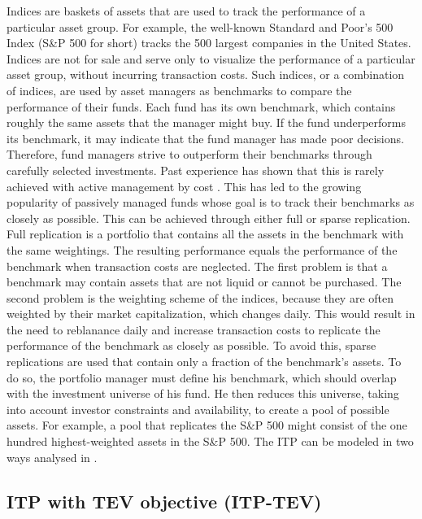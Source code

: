 \documentclass[
  oneside]{book}
\begin{document}
Indices are baskets of assets that are used to track the performance of a particular asset group. For example, the well-known Standard and Poor's 500 Index (S\&P 500 for short) tracks the 500 largest companies in the United States. Indices are not for sale and serve only to visualize the performance of a particular asset group, without incurring transaction costs. Such indices, or a combination of indices, are used by asset managers as benchmarks to compare the performance of their funds. Each fund has its own benchmark, which contains roughly the same assets that the manager might buy. If the fund underperforms its benchmark, it may indicate that the fund manager has made poor decisions. Therefore, fund managers strive to outperform their benchmarks through carefully selected investments. Past experience has shown that this is rarely achieved with active management by cost \citep{Desm2016}. This has led to the growing popularity of passively managed funds whose goal is to track their benchmarks as closely as possible. This can be achieved through either full or sparse replication. Full replication is a portfolio that contains all the assets in the benchmark with the same weightings. The resulting performance equals the performance of the benchmark when transaction costs are neglected. The first problem is that a benchmark may contain assets that are not liquid or cannot be purchased. The second problem is the weighting scheme of the indices, because they are often weighted by their market capitalization, which changes daily. This would result in the need to reblanance daily and increase transaction costs to replicate the performance of the benchmark as closely as possible. To avoid this, sparse replications are used that contain only a fraction of the benchmark's assets. To do so, the portfolio manager must define his benchmark, which should overlap with the investment universe of his fund. He then reduces this universe, taking into account investor constraints and availability, to create a pool of possible assets. For example, a pool that replicates the S\&P 500 might consist of the one hundred highest-weighted assets in the S\&P 500. The ITP can be modeled in two ways analysed in \citep{IuGa2019}.

\hypertarget{itp-with-tev-objective-itp-tev}{%
\subsection{ITP with TEV objective (ITP-TEV)}\label{itp-with-tev-objective-itp-tev}}
\end{document}
